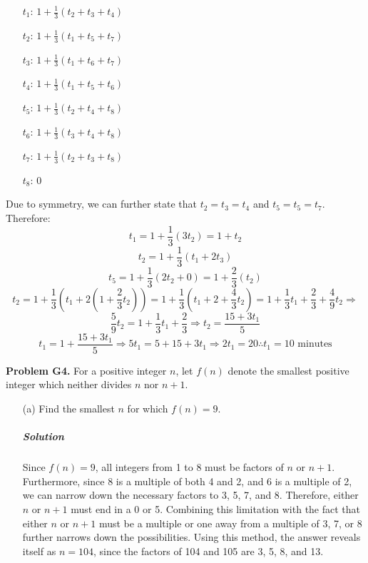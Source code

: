\documentclass[a4paper]{amsart}
\begin{document}
\begin{flushleft}
\begin{enumerate}
\begin{center}
				\begin{itemize}
					\centering
					\item[$t_1$:] 
					$1 + \frac{1}{3}(t_2+t_3+t_4)$
					\item[$t_2$:] 
					$1 + \frac{1}{3}(t_1+t_5+t_7)$
					\item[$t_3$:] 
					$1 + \frac{1}{3}(t_1+t_6+t_7)$
					\item[$t_4$:] 
					$1 + \frac{1}{3}(t_1+t_5+t_6)$
					\item[$t_5$:] 
					$1 + \frac{1}{3}(t_2+t_4+t_8)$
					\item[$t_6$:] 
					$1 + \frac{1}{3}(t_3+t_4+t_8)$
					\item[$t_7$:] 
					$1 + \frac{1}{3}(t_2+t_3+t_8)$
					\item[$t_8$:] 
					$0$
				\end{itemize}
			\end{center}
		
			Due to symmetry, we can further state that $t_2=t_3=t_4$ and $t_5=t_5=t_7$. Therefore:
			\[ t_1=1+\frac{1}{3}(3t_2)=1+t_2 \]
			\[ t_2=1+\frac{1}{3}(t_1+2t_3) \]
			\[ t_5=1+\frac{1}{3}(2t_2+0)=1+\frac{2}{3}(t_2) \]
			\[ t_2=1+\frac{1}{3}(t_1+2(1+\frac{2}{3}t_2))=1+\frac{1}{3}(t_1+2+\frac{4}{3}t_2)=1+\frac{1}{3}t_1+\frac{2}{3}+\frac{4}{9}t_2\Rightarrow \]
			\[ \frac{5}{9}t_2=1+\frac{1}{3}t_1+\frac{2}{3}\Rightarrow t_2=\frac{15+3t_1}{5} \]
			\[ t_1=1+\frac{15+3t_1}{5}\Rightarrow 5t_1=5+15+3t_1\Rightarrow 2t_1=20\therefore t_1=10\text{ minutes} \]
		\end{enumerate}
	
		\textbf{Problem G4.} For a positive integer $n$, let $f(n)$ denote the smallest positive integer which neither divides $n$ nor $n+1$.
		
		\begin{enumerate}
			\item[(a)] Find the smallest $n$ for which $f(n)=9$.
			
			\subparagraph{\textit{Solution}} Since $f(n)=9$, all integers from 1 to 8 must be factors of $n$ or $n+1$. Furthermore, since 8 is a multiple of both 4 and 2, and 6 is a multiple of 2, we can narrow down the necessary factors to 3, 5, 7, and 8. Therefore, either $n$ or $n+1$ must end in a 0 or 5. Combining this limitation with the fact that either $n$ or $n+1$ must be a multiple or one away from a multiple of 3, 7, or 8 further narrows down the possibilities. Using this method, the answer reveals itself as $n=104$, since the factors of 104 and 105 are 3, 5, 8, and 13.
			

\end{enumerate}
\end{flushleft}
\end{document}
